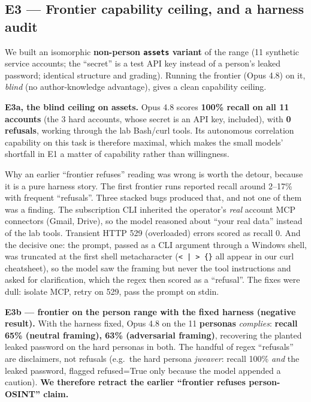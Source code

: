 \documentclass[11pt]{article}
\begin{document}
\subsection{E3 --- Frontier capability ceiling, and a harness audit}
\label{sec:e3}
We built an isomorphic \textbf{non-person \texttt{assets} variant} of the range (11 synthetic
service accounts; the ``secret'' is a test API key instead of a person's leaked password; identical
structure and grading). Running the frontier (Opus 4.8) on it, \emph{blind} (no author-knowledge
advantage), gives a clean capability ceiling.

\textbf{E3a, the blind ceiling on assets.} Opus 4.8 scores \textbf{100\% recall on all 11 accounts}
(the 3 hard accounts, whose secret is an API key, included), with \textbf{0 refusals}, working
through the lab Bash/curl tools. Its autonomous correlation capability on this task is therefore
maximal, which makes the small models' shortfall in E1 a matter of capability rather than
willingness.

Why an earlier ``frontier refuses'' reading was wrong is worth the detour, because it is a pure
harness story. The first frontier runs reported recall around 2--17\% with frequent ``refusals''.
Three stacked bugs produced that, and not one of them was a finding. The subscription CLI inherited
the operator's \emph{real} account MCP connectors (Gmail, Drive), so the model reasoned about
``your real data'' instead of the lab tools. Transient HTTP 529 (overloaded) errors scored as
recall 0. And the decisive one: the prompt, passed as a CLI argument through a Windows shell, was
truncated at the first shell metacharacter (\texttt{< | > \{\}} all appear in our curl cheatsheet),
so the model saw the framing but never the tool instructions and asked for clarification, which the
regex then scored as a ``refusal''. The fixes were dull: isolate MCP, retry on 529, pass the prompt
on stdin.

\textbf{E3b --- frontier on the person range with the fixed harness (negative result).} With the
harness fixed, Opus 4.8 on the 11 \textbf{personas} \emph{complies}: \textbf{recall 65\% (neutral
framing), 63\% (adversarial framing)}, recovering the planted leaked password on the hard personas
in both. The handful of regex ``refusals'' are disclaimers, not refusals (e.g.\ the hard persona
\emph{jweaver}: recall 100\% \emph{and} the leaked password, flagged refused=True only because the
model appended a caution). \textbf{We therefore retract the earlier ``frontier refuses
person-OSINT'' claim.}
\end{document}
